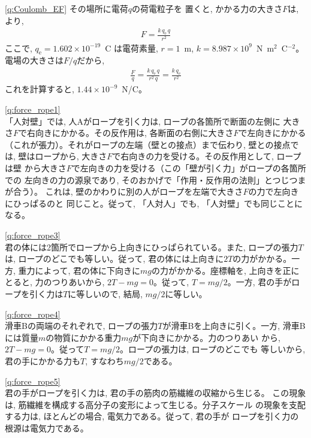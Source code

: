 \ref{q:Coulomb_EF} その場所に電荷$q$の荷電粒子を
置くと, かかる力の大きさ$F$は, 
より, 
\begin{eqnarray}
F=\frac{k\,q_{\text{e}}\,q}{r^2}
\end{eqnarray}
ここで, $q_{\text{e}}=1.602\times10^{-19}$~C
は電荷素量, $r=1$~m, $k=8.987\times 10^{9}$~N~m$^2$~C$^{-2}$。
電場の大きさは$F/q$だから, 
\begin{eqnarray}
\frac{F}{q}=\frac{k\,q_{\text{e}}\,q}{r^2\,q}=\frac{k\,q_{\text{e}}}{r^2}
\end{eqnarray}
これを計算すると, $1.44\times10^{-9}$~N/C。\mv


\ref{q:force_rope1}\\
「人対壁」では, 人Aがロープを引く力は, ロープの各箇所で断面の左側に
大きさ$F$で右向きにかかる。その反作用は, 各断面の右側に大きさ$F$で左向きにかかる
（これが張力）。それがロープの左端（壁との接点）まで伝わり, 壁との接点では, 
壁はロープから, 大きさ$F$で右向きの力を受ける。その反作用として, ロープは壁
から大きさ$F$で左向きの力を受ける（この「壁が引く力」がロープの各箇所での
左向きの力の源泉であり, そのおかげで「作用・反作用の法則」とつじつまが合う）。
これは, 壁のかわりに別の人がロープを左端で大きさ$F$の力で左向きにひっぱるのと
同じこと。従って, 「人対人」でも, 「人対壁」でも同じことになる。
\vspace{0.2cm}

%
\ref{q:force_rope3}\\
君の体には2箇所でロープから上向きにひっぱられている。また, ロープの張力$T$は, 
ロープのどこでも等しい。従って, 君の体には上向きに$2T$の力がかかる。一方, 
重力によって, 君の体に下向きに$mg$の力がかかる。座標軸を, 上向きを正にとると, 力のつりあいから, 
$2T-mg=0$。従って, $T=mg/2$。一方, 君の手がロープを引く力は$T$に等しいので, 
結局, $mg/2$に等しい。
\mv

%
\ref{q:force_rope4}\\
滑車Bの両端のそれぞれで, ロープの張力$T$が滑車Bを上向きに引く。一方, 
滑車Bには質量$m$の物質にかかる重力$mg$が下向きにかかる。力のつりあい
から, $2T-mg=0$。従って$T=mg/2$。ロープの張力は, ロープのどこでも
等しいから, 君の手にかかる力も$T$, すなわち$mg/2$である。
\vspace{0.2cm}

%
\ref{q:force_rope5}\\
君の手がロープを引く力は, 君の手の筋肉の筋繊維の収縮から生じる。
この現象は, 筋繊維を構成する高分子の変形によって生じる。分子スケール
の現象を支配する力は, ほとんどの場合, 電気力である。従って, 君の手が
ロープを引く力の根源は電気力である。
\vspace{0.2cm}

